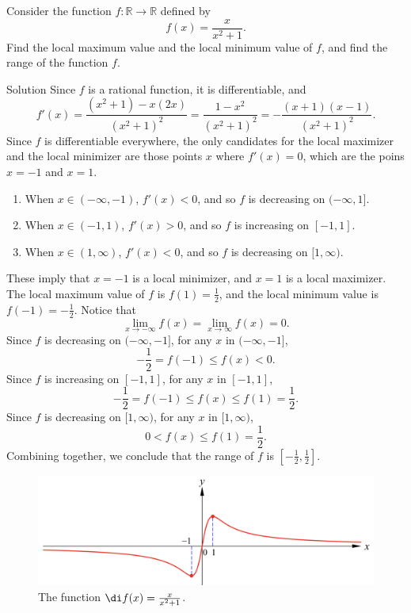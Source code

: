 \begin{example}[label=ex230216_1]{}
Consider the function $f:\mathbb{R}\to\mathbb{R}$ defined by
\[f(x)=\frac{x}{x^2+1}.\]
Find the local maximum value and the local minimum value of $f$, and find the range of the function $f$. 
 
\end{example}
\begin{solution}{Solution}
Since $f$ is a rational function, it is differentiable, and
\[f'(x)=\frac{(x^2+1)-x(2x)}{(x^2+1)^2}=\frac{1-x^2}{(x^2+1)^2}=-\frac{(x+1)(x-1)}{(x^2+1)^2}.\]Since $f$ is differentiable everywhere, the only candidates for the local maximizer and the local minimizer are those points $x$ where $f'(x)=0$, which are the poins $x=-1$ and $x=1$.
\begin{enumerate}[$\bullet$\;\;]
\item
 When $x\in (-\infty, -1)$, $f'(x)<0$,  and so $f$ is   decreasing on $(-\infty, 1]$. 
\item When $x\in (-1, 1)$, $f'(x)>0$,  and so $f$ is   increasing on $[-1, 1]$. 
\item When $x\in (1, \infty)$, $f'(x)<0$,  and so $f$ is   decreasing on $[1, \infty)$. 
\end{enumerate}These imply that $x=-1$ is a local minimizer, and   $x=1$ is a local maximizer. 
The local maximum value of $f$ is $f(1)=\frac{1}{2}$, and the local minimum value is $f(-1)=-\frac{1}{2}$.
Notice that
\[\lim_{x\to -\infty}f(x)=\lim_{x\to\infty} f(x)=0.\]Since $f$ is   decreasing on $(-\infty, -1]$,   for any $x$ in $(-\infty, -1]$, \[-\frac{1}{2}=f(-1)\leq f(x)<0.\]
Since $f$ is   increasing on $[-1, 1]$, for any $x$ in $[-1, 1]$, 
\[-\frac{1}{2}=f(-1)\leq f(x)\leq f(1)=\frac{1}{2}.\]
\bs Since $f$ is decreasing   on $[1, \infty)$,  for any $x$ in $[1, \infty)$, \[0<f(x)\leq f(1)=\frac{1}{2}.\]
Combining together, we conclude that the range of $f$ is $[-\frac{1}{2}, \frac{1}{2}]$.
 
\end{solution}


 \begin{figure}[ht]
\centering
\includegraphics[scale=0.2]{Picture25.png}
\caption{  The function $\di f(x)=\frac{x}{x^2+1}$.\fa}\label{figure25}
\end{figure}

